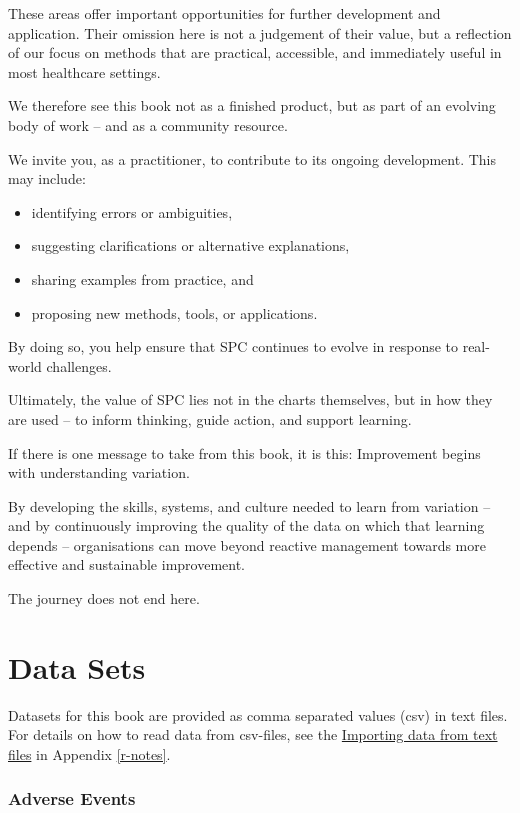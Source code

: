 \documentclass[
]{book}
\providecommand{\tightlist}{%
  \setlength{\itemsep}{0pt}\setlength{\parskip}{0pt}}
\begin{document}
These areas offer important opportunities for further development and application. Their omission here is not a judgement of their value, but a reflection of our focus on methods that are practical, accessible, and immediately useful in most healthcare settings.

We therefore see this book not as a finished product, but as part of an evolving body of work -- and as a community resource.

We invite you, as a practitioner, to contribute to its ongoing development. This may include:

\begin{itemize}
\tightlist
\item
  identifying errors or ambiguities,
\item
  suggesting clarifications or alternative explanations,
\item
  sharing examples from practice, and
\item
  proposing new methods, tools, or applications.
\end{itemize}

By doing so, you help ensure that SPC continues to evolve in response to real-world challenges.

Ultimately, the value of SPC lies not in the charts themselves, but in how they are used -- to inform thinking, guide action, and support learning.

If there is one message to take from this book, it is this: Improvement begins with understanding variation.

By developing the skills, systems, and culture needed to learn from variation -- and by continuously improving the quality of the data on which that learning depends -- organisations can move beyond reactive management towards more effective and sustainable improvement.

The journey does not end here.

\appendix


\chapter{Data Sets}\label{data-sets}

Datasets for this book are provided as comma separated values (csv) in text files. For details on how to read data from csv-files, see the \hyperref[importing-data-from-text-files]{Importing data from text files} in Appendix \ref{r-notes}.

\subsection*{Adverse Events}\label{adverse-events}
\end{document}
